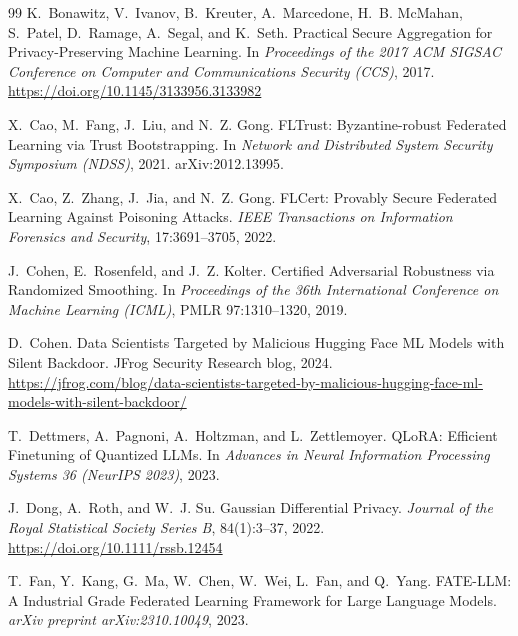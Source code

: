 \begin{thebibliography}{99}
K.~Bonawitz, V.~Ivanov, B.~Kreuter, A.~Marcedone, H.~B. McMahan, S.~Patel, D.~Ramage, A.~Segal, and K.~Seth.
\newblock Practical Secure Aggregation for Privacy-Preserving Machine Learning.
\newblock In \emph{Proceedings of the 2017 ACM SIGSAC Conference on Computer and Communications Security (CCS)}, 2017.
\newblock \url{https://doi.org/10.1145/3133956.3133982}

X.~Cao, M.~Fang, J.~Liu, and N.~Z. Gong.
\newblock FLTrust: Byzantine-robust Federated Learning via Trust Bootstrapping.
\newblock In \emph{Network and Distributed System Security Symposium (NDSS)}, 2021.
\newblock arXiv:2012.13995.

X.~Cao, Z.~Zhang, J.~Jia, and N.~Z. Gong.
\newblock FLCert: Provably Secure Federated Learning Against Poisoning Attacks.
\newblock \emph{IEEE Transactions on Information Forensics and Security}, 17:3691--3705, 2022.

J.~Cohen, E.~Rosenfeld, and J.~Z. Kolter.
\newblock Certified Adversarial Robustness via Randomized Smoothing.
\newblock In \emph{Proceedings of the 36th International Conference on Machine Learning (ICML)}, PMLR 97:1310--1320, 2019.

D.~Cohen.
\newblock Data Scientists Targeted by Malicious Hugging Face ML Models with Silent Backdoor.
\newblock JFrog Security Research blog, 2024.
\newblock \url{https://jfrog.com/blog/data-scientists-targeted-by-malicious-hugging-face-ml-models-with-silent-backdoor/}

T.~Dettmers, A.~Pagnoni, A.~Holtzman, and L.~Zettlemoyer.
\newblock QLoRA: Efficient Finetuning of Quantized LLMs.
\newblock In \emph{Advances in Neural Information Processing Systems 36 (NeurIPS 2023)}, 2023.

J.~Dong, A.~Roth, and W.~J. Su.
\newblock Gaussian Differential Privacy.
\newblock \emph{Journal of the Royal Statistical Society Series B}, 84(1):3--37, 2022.
\newblock \url{https://doi.org/10.1111/rssb.12454}

T.~Fan, Y.~Kang, G.~Ma, W.~Chen, W.~Wei, L.~Fan, and Q.~Yang.
\newblock FATE-LLM: A Industrial Grade Federated Learning Framework for Large Language Models.
\newblock \emph{arXiv preprint arXiv:2310.10049}, 2023.


\end{thebibliography}
